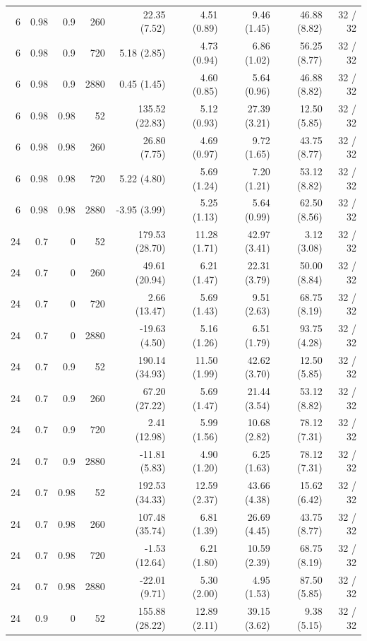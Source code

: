 \begin{longtable}{rrrrrrrrr}
6 & 0.98 & 0.9 & 260 & 22.35 (7.52) & 4.51 (0.89) & 9.46 (1.45) & 46.88 (8.82) & 32 / 32\\
6 & 0.98 & 0.9 & 720 & 5.18 (2.85) & 4.73 (0.94) & 6.86 (1.02) & 56.25 (8.77) & 32 / 32\\
6 & 0.98 & 0.9 & 2880 & 0.45 (1.45) & 4.60 (0.85) & 5.64 (0.96) & 46.88 (8.82) & 32 / 32\\
6 & 0.98 & 0.98 & 52 & 135.52 (22.83) & 5.12 (0.93) & 27.39 (3.21) & 12.50 (5.85) & 32 / 32\\
6 & 0.98 & 0.98 & 260 & 26.80 (7.75) & 4.69 (0.97) & 9.72 (1.65) & 43.75 (8.77) & 32 / 32\\
6 & 0.98 & 0.98 & 720 & 5.22 (4.80) & 5.69 (1.24) & 7.20 (1.21) & 53.12 (8.82) & 32 / 32\\
6 & 0.98 & 0.98 & 2880 & -3.95 (3.99) & 5.25 (1.13) & 5.64 (0.99) & 62.50 (8.56) & 32 / 32\\
24 & 0.7 & 0 & 52 & 179.53 (28.70) & 11.28 (1.71) & 42.97 (3.41) & 3.12 (3.08) & 32 / 32\\
24 & 0.7 & 0 & 260 & 49.61 (20.94) & 6.21 (1.47) & 22.31 (3.79) & 50.00 (8.84) & 32 / 32\\
24 & 0.7 & 0 & 720 & 2.66 (13.47) & 5.69 (1.43) & 9.51 (2.63) & 68.75 (8.19) & 32 / 32\\
24 & 0.7 & 0 & 2880 & -19.63 (4.50) & 5.16 (1.26) & 6.51 (1.79) & 93.75 (4.28) & 32 / 32\\
24 & 0.7 & 0.9 & 52 & 190.14 (34.93) & 11.50 (1.99) & 42.62 (3.70) & 12.50 (5.85) & 32 / 32\\
24 & 0.7 & 0.9 & 260 & 67.20 (27.22) & 5.69 (1.47) & 21.44 (3.54) & 53.12 (8.82) & 32 / 32\\
24 & 0.7 & 0.9 & 720 & 2.41 (12.98) & 5.99 (1.56) & 10.68 (2.82) & 78.12 (7.31) & 32 / 32\\
24 & 0.7 & 0.9 & 2880 & -11.81 (5.83) & 4.90 (1.20) & 6.25 (1.63) & 78.12 (7.31) & 32 / 32\\
24 & 0.7 & 0.98 & 52 & 192.53 (34.33) & 12.59 (2.37) & 43.66 (4.38) & 15.62 (6.42) & 32 / 32\\
24 & 0.7 & 0.98 & 260 & 107.48 (35.74) & 6.81 (1.39) & 26.69 (4.45) & 43.75 (8.77) & 32 / 32\\
24 & 0.7 & 0.98 & 720 & -1.53 (12.64) & 6.21 (1.80) & 10.59 (2.39) & 68.75 (8.19) & 32 / 32\\
24 & 0.7 & 0.98 & 2880 & -22.01 (9.71) & 5.30 (2.00) & 4.95 (1.53) & 87.50 (5.85) & 32 / 32\\
24 & 0.9 & 0 & 52 & 155.88 (28.22) & 12.89 (2.11) & 39.15 (3.62) & 9.38 (5.15) & 32 / 32\\

\end{longtable}
